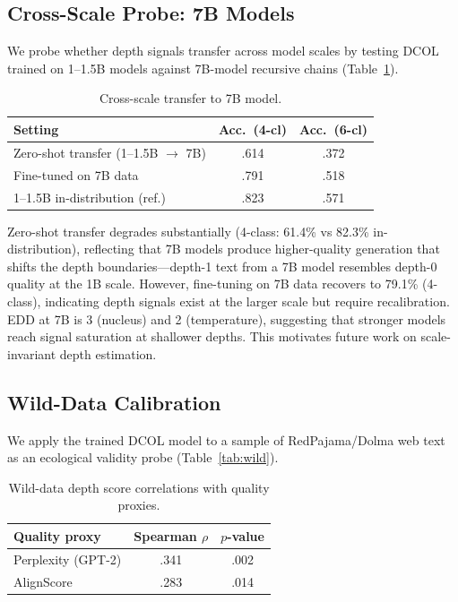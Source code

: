 \documentclass[11pt,a4paper]{article}
\begin{document}
\subsection{Cross-Scale Probe: 7B Models}
\label{sec:7b}

We probe whether depth signals transfer across model scales by testing DCOL trained on 1--1.5B models against 7B-model recursive chains (Table~\ref{tab:7b}).

\begin{table}[t]
\centering
\small
\caption{Cross-scale transfer to 7B model.}
\label{tab:7b}
\begin{tabular}{@{}lcc@{}}
\toprule
\textbf{Setting} & \textbf{Acc.\ (4-cl)} & \textbf{Acc.\ (6-cl)} \\
\midrule
Zero-shot transfer (1--1.5B $\to$ 7B) & .614 & .372 \\
Fine-tuned on 7B data & .791 & .518 \\
1--1.5B in-distribution (ref.) & .823 & .571 \\
\bottomrule
\end{tabular}
\end{table}

Zero-shot transfer degrades substantially (4-class: 61.4\% vs 82.3\% in-distribution), reflecting that 7B models produce higher-quality generation that shifts the depth boundaries---depth-1 text from a 7B model resembles depth-0 quality at the 1B scale.
However, fine-tuning on 7B data recovers to 79.1\% (4-class), indicating depth signals exist at the larger scale but require recalibration.
EDD at 7B is 3 (nucleus) and 2 (temperature), suggesting that stronger models reach signal saturation at shallower depths.
This motivates future work on scale-invariant depth estimation.

\subsection{Wild-Data Calibration}
\label{sec:wild}

We apply the trained DCOL model to a sample of RedPajama/Dolma web text as an ecological validity probe (Table~\ref{tab:wild}).

\begin{table}[t]
\centering
\small
\caption{Wild-data depth score correlations with quality proxies.}
\label{tab:wild_corr}
\begin{tabular}{@{}lcc@{}}
\toprule
\textbf{Quality proxy} & \textbf{Spearman $\rho$} & \textbf{$p$-value} \\
\midrule
Perplexity (GPT-2) & .341 & .002 \\
AlignScore & .283 & .014 \\
\bottomrule
\end{tabular}
\end{table}
\end{document}
